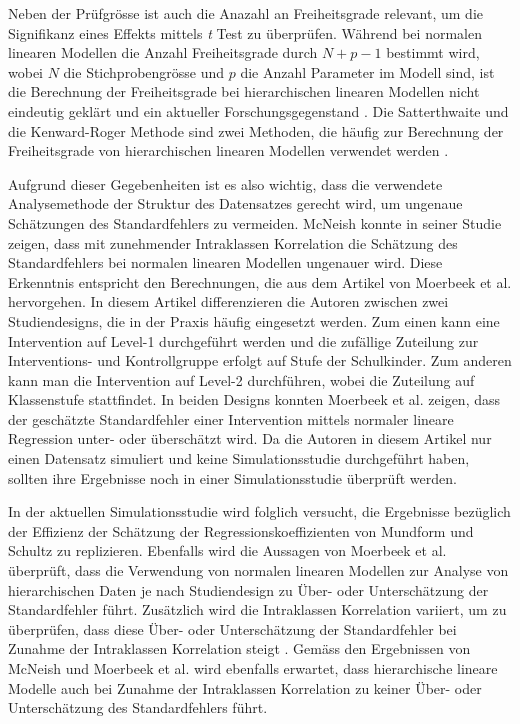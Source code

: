 \documentclass[12pt]{article}\usepackage[]{graphicx}\usepackage[]{color}
\begin{document}
Neben der Prüfgrösse ist auch die Anazahl an Freiheitsgrade relevant, um die Signifikanz eines Effekts mittels \textit{t} Test zu überprüfen. Während bei normalen linearen Modellen die Anzahl Freiheitsgrade durch $N + p - 1$ bestimmt wird, wobei $N$ die Stichprobengrösse und $p$ die Anzahl Parameter im Modell sind, ist die Berechnung der Freiheitsgrade bei hierarchischen linearen Modellen nicht eindeutig geklärt und ein aktueller Forschungsgegenstand \citep{mcneish2014analyzing,raudenbush2002hierarchical,SnijdersTomA.B2012Ma:a}. Die Satterthwaite \citeyearpar{satter1941synthesis} und die Kenward-Roger Methode \citeyearpar{kenward1997method} sind zwei Methoden, die häufig zur Berechnung der Freiheitsgrade von hierarchischen linearen Modellen verwendet werden \citep{raudenbush2002hierarchical,SnijdersTomA.B2012Ma:a}.

Aufgrund dieser Gegebenheiten ist es also wichtig, dass die verwendete Analysemethode der Struktur des Datensatzes gerecht wird, um ungenaue Schätzungen des Standardfehlers zu vermeiden. McNeish \citeyearpar{mcneish2014analyzing} konnte in seiner Studie zeigen, dass mit zunehmender Intraklassen Korrelation die Schätzung des Standardfehlers bei normalen linearen Modellen ungenauer wird. Diese Erkenntnis entspricht den Berechnungen, die aus dem Artikel von Moerbeek et al. \citeyearpar{MOERBEEK2003341} hervorgehen. In diesem Artikel differenzieren die Autoren zwischen zwei Studiendesigns, die in der Praxis häufig eingesetzt werden. Zum einen kann eine Intervention auf Level-1 durchgeführt werden und die zufällige Zuteilung zur Interventions- und Kontrollgruppe erfolgt auf Stufe der Schulkinder. Zum anderen kann man die Intervention auf Level-2 durchführen, wobei die Zuteilung auf Klassenstufe stattfindet. In beiden Designs konnten Moerbeek et al. zeigen, dass der geschätzte Standardfehler einer Intervention mittels normaler lineare Regression unter- oder überschätzt wird. Da die Autoren in diesem Artikel nur einen Datensatz simuliert und keine Simulationsstudie durchgeführt haben, sollten ihre Ergebnisse noch in einer Simulationsstudie überprüft werden. 

In der aktuellen Simulationsstudie wird folglich versucht, die Ergebnisse bezüglich der Effizienz der Schätzung der Regressionskoeffizienten von Mundform und Schultz \citeyearpar{mundfrom2002monte} zu replizieren. Ebenfalls wird die Aussagen von Moerbeek et al. \citeyearpar{MOERBEEK2003341} überprüft, dass die Verwendung von normalen linearen Modellen zur Analyse von hierarchischen Daten je nach Studiendesign zu Über- oder Unterschätzung der Standardfehler führt. Zusätzlich wird die Intraklassen Korrelation variiert, um zu überprüfen, dass diese Über- oder Unterschätzung der Standardfehler bei Zunahme der Intraklassen Korrelation steigt \citep{mcneish2014analyzing}. Gemäss den Ergebnissen von McNeish \citep{mcneish2014analyzing} und Moerbeek et al. \citeyearpar{MOERBEEK2003341} wird ebenfalls erwartet, dass hierarchische lineare Modelle auch bei Zunahme der Intraklassen Korrelation zu keiner Über- oder Unterschätzung des Standardfehlers führt.
\end{document}
